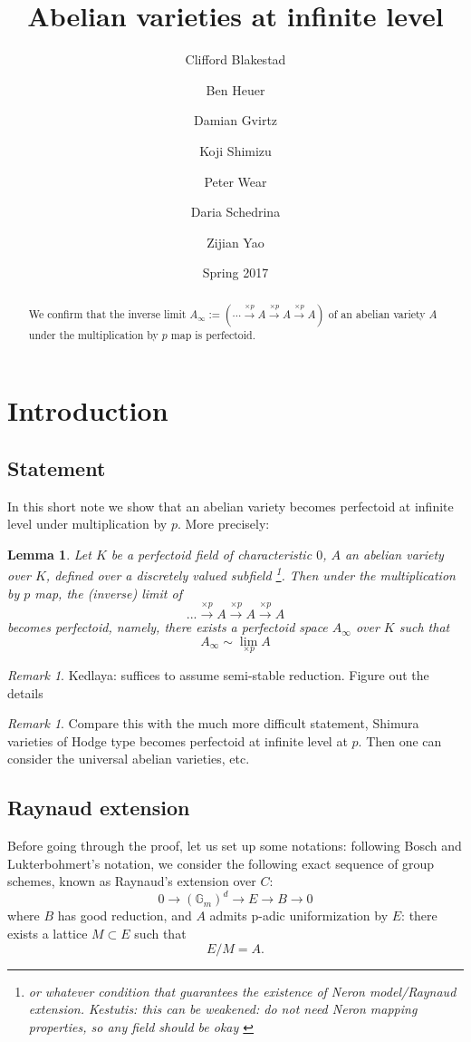\documentclass[11pt,oneside]{amsart}
\title[Abelian varieties at infinite level]{Abelian varieties at infinite level}
\date{Spring 2017}
\author{
Clifford Blakestad \and
Ben Heuer \and 
Damian Gvirtz \and
Koji Shimizu \and 
Peter Wear \and
Daria Schedrina \and
Zijian Yao}
\theoremstyle{theorem}
\newtheorem{lemma}[theorem]{Lemma}
\theoremstyle{definition}
\theoremstyle{remark}
\newtheorem{remark}[theorem]{Remark}
\begin{document}
	
\maketitle

\begin{abstract}
We confirm that the inverse limit  $A_\infty := ( \cdots \xrightarrow{\times p } A \xrightarrow{\times p } A \xrightarrow{\times p } A )$ of an abelian variety $A$ under the multiplication by $p$ map is perfectoid. 
\end{abstract}

\section{Introduction}
	
\subsection{Statement}
In this short note we show that an abelian variety becomes perfectoid at infinite level under multiplication by $p$. More precisely:
\begin{lemma} \label{main_lemma}
Let $K$ be a perfectoid field of characteristic $0$, $A$ an abelian variety over $K$, defined over a discretely valued subfield \footnote{or whatever condition that guarantees the existence of Neron model/Raynaud extension. { \color{red} Kestutis: this can be weakened: do not need Neron mapping properties, so any field should be okay } }. Then  under the multiplication by $p$ map, the (inverse) limit of 
$$ ... \xrightarrow{\times p} A \xrightarrow{\times p} A \xrightarrow{\times p} A   $$
becomes perfectoid, namely, there exists a perfectoid space $A_\infty$ over $K$ such that 
$$A_\infty \sim \lim_{\times p} A$$
\end{lemma}


\begin{remark}
{\color{red} Kedlaya: suffices to assume semi-stable reduction. Figure out the details } 
\end{remark}

\begin{remark}
 Compare this with the much more difficult statement, Shimura varieties of Hodge type becomes perfectoid at infinite level at $p$. Then one can consider the universal abelian varieties, etc. 
\end{remark}

\subsection{Raynaud extension}
Before going through the proof, let us set up some notations: following Bosch and Lukterbohmert's notation, we consider the following exact sequence of group schemes, known as Raynaud's extension over $C$: 
$$ 0 \rightarrow (\mathbb G_m)^d \rightarrow E \rightarrow B \rightarrow 0 $$  where $B$ has good reduction, and $A$ admits p-adic uniformization by $E$: there exists a lattice $M \subset E$ such that 
$$ E/M = A.$$
\end{document}
